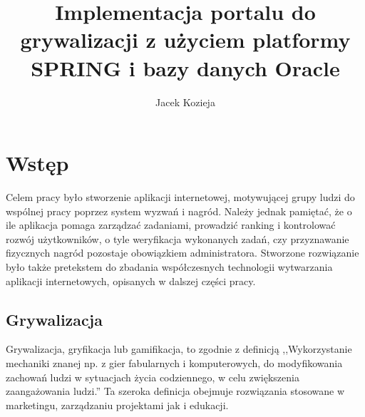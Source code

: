 \documentclass[a4paper,12pt,twoside,openany]{report}
\title{Implementacja portalu do grywalizacji z użyciem platformy SPRING i bazy danych Oracle}
\author{Jacek Kozieja}
\begin{document}
\maketitle
\chapter{Wstęp}
Celem pracy było stworzenie aplikacji internetowej, motywującej grupy ludzi do wspólnej pracy poprzez system wyzwań i nagród. Należy jednak pamiętać, że o ile aplikacja pomaga zarządzać zadaniami, prowadzić ranking i kontrolować rozwój użytkowników, o tyle weryfikacja wykonanych zadań, czy przyznawanie fizycznych nagród pozostaje obowiązkiem administratora. Stworzone rozwiązanie było także pretekstem do zbadania współczesnych technologii wytwarzania aplikacji internetowych, opisanych w dalszej części pracy.
\section{Grywalizacja}
	Grywalizacja, gryfikacja lub gamifikacja, to zgodnie z definicją \cite{Wikipedia} ,,Wykorzystanie mechaniki znanej np. z gier fabularnych i komputerowych, do modyfikowania zachowań ludzi w sytuacjach życia codziennego, w celu zwiększenia zaangażowania ludzi.'' Ta szeroka definicja obejmuje rozwiązania stosowane w marketingu, zarządzaniu projektami jak i edukacji.
\end{document}
